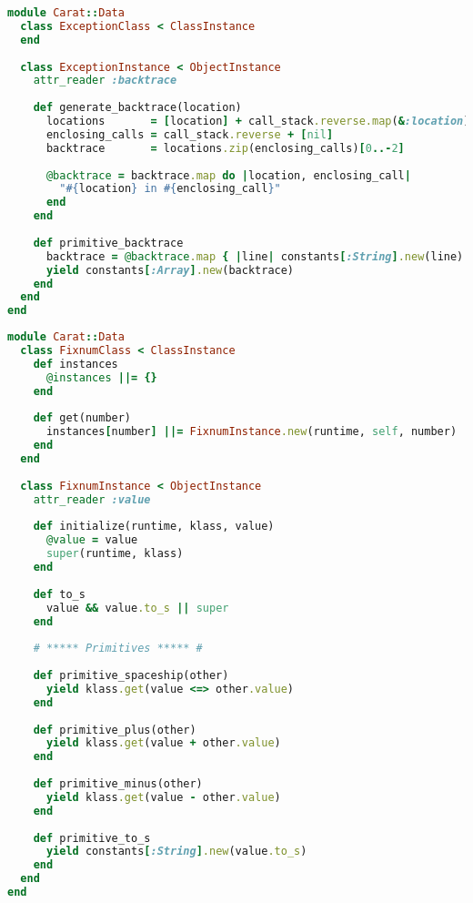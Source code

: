 \begin{lstlisting}[title={\small\ttfamily\bfseries data/exception.rb},language=Ruby]
module Carat::Data
  class ExceptionClass < ClassInstance
  end
  
  class ExceptionInstance < ObjectInstance
    attr_reader :backtrace
    
    def generate_backtrace(location)
      locations       = [location] + call_stack.reverse.map(&:location)
      enclosing_calls = call_stack.reverse + [nil]
      backtrace       = locations.zip(enclosing_calls)[0..-2]
      
      @backtrace = backtrace.map do |location, enclosing_call|
        "#{location} in #{enclosing_call}"
      end
    end
    
    def primitive_backtrace
      backtrace = @backtrace.map { |line| constants[:String].new(line) }
      yield constants[:Array].new(backtrace)
    end
  end
end

\end{lstlisting}
\begin{lstlisting}[title={\small\ttfamily\bfseries data/fixnum.rb},language=Ruby]
module Carat::Data
  class FixnumClass < ClassInstance
    def instances
      @instances ||= {}
    end
    
    def get(number)
      instances[number] ||= FixnumInstance.new(runtime, self, number)
    end
  end
  
  class FixnumInstance < ObjectInstance
    attr_reader :value
    
    def initialize(runtime, klass, value)
      @value = value
      super(runtime, klass)
    end
    
    def to_s
      value && value.to_s || super
    end
    
    # ***** Primitives ***** #
    
    def primitive_spaceship(other)
      yield klass.get(value <=> other.value)
    end
    
    def primitive_plus(other)
      yield klass.get(value + other.value)
    end
    
    def primitive_minus(other)
      yield klass.get(value - other.value)
    end
    
    def primitive_to_s
      yield constants[:String].new(value.to_s)
    end
  end
end

\end{lstlisting}
